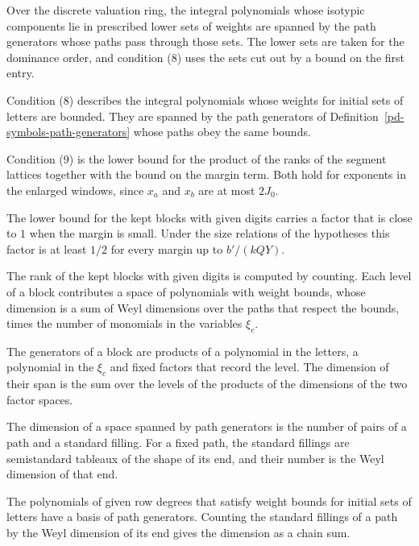 Over the discrete valuation ring, the integral polynomials whose isotypic components lie in prescribed
lower sets of weights are spanned by the path generators whose paths pass through those sets. The lower
sets are taken for the dominance order, and condition (8) uses the sets cut out by a bound on the first
entry.

Condition (8) describes the integral polynomials whose weights for initial sets of letters are bounded.
They are spanned by the path generators of Definition~\ref{pd-symbols-path-generators} whose paths obey
the same bounds.

Condition (9) is the lower bound for the product of the ranks of the segment lattices together with the
bound on the margin term. Both hold for exponents in the enlarged windows, since $x_a$ and $x_b$ are at
most $2J_0$.

The lower bound for the kept blocks with given digits carries a factor that is close to $1$ when the margin
is small. Under the size relations of the hypotheses this factor is at least $1/2$ for every margin up to
$b'/(kQY)$.

The rank of the kept blocks with given digits is computed by counting. Each level of a block contributes
a space of polynomials with weight bounds, whose dimension is a sum of Weyl dimensions over the paths that
respect the bounds, times the number of monomials in the variables $\xi_c$.

The generators of a block are products of a polynomial in the letters, a polynomial in the $\xi_c$ and
fixed factors that record the level. The dimension of their span is the sum over the levels of the
products of the dimensions of the two factor spaces.

The dimension of a space spanned by path generators is the number of pairs of a path and a standard
filling. For a fixed path, the standard fillings are semistandard tableaux of the shape of its end, and
their number is the Weyl dimension of that end.

The polynomials of given row degrees that satisfy weight bounds for initial sets of letters have a basis of
path generators. Counting the standard fillings of a path by the Weyl dimension of its end gives the
dimension as a chain sum.

